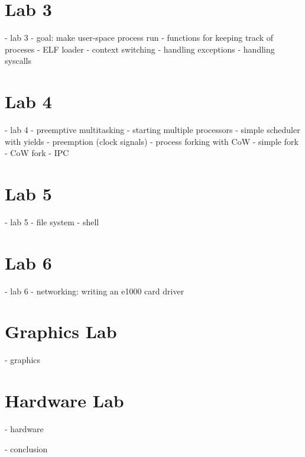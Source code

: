 \documentclass{article}
\begin{document}
\section*{Lab 3}
- lab 3
	- goal: make user-space process run
	- functions for keeping track of proceses
	- ELF loader
	- context switching
	- handling exceptions
	- handling syscalls


\section*{Lab 4}
- lab 4
	- preemptive multitasking
		- starting multiple processors
		- simple scheduler with yields
		- preemption (clock signals)
	- process forking with CoW
		- simple fork
		- CoW fork
	- IPC


\section*{Lab 5}
- lab 5
	- file system
	- shell


\section*{Lab 6}
- lab 6
	- networking: writing an e1000 card driver


\section*{Graphics Lab}
- graphics

\section*{Hardware Lab}
- hardware



- conclusion


\end{document}
